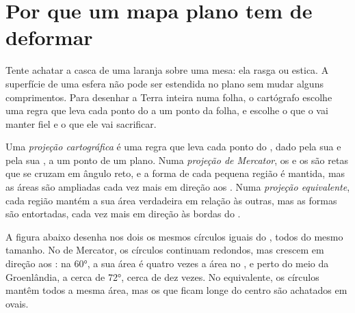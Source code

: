 \section{Por que um mapa plano tem de deformar}

Tente achatar a casca de uma laranja sobre uma mesa: ela rasga ou estica.
A superfície de uma esfera não pode ser estendida no plano sem mudar
alguns comprimentos. Para desenhar a Terra inteira numa folha, o
cartógrafo escolhe uma regra que leva cada ponto do  a um ponto da
folha, e escolhe o que o  vai manter fiel e o que ele vai sacrificar.

\begin{definition}\label{def:g9:maps-of-the-earth:projection}
Uma \emph{projeção cartográfica}
é uma regra que leva cada ponto do , dado pela sua  e pela
sua , a um ponto de um  plano. Numa \emph{projeção de
Mercator}, os  e
os  são retas que se cruzam em ângulo reto, e a forma de cada
pequena região é mantida, mas as áreas são ampliadas cada vez mais em
direção aos . Numa \emph{projeção
equivalente}, cada
região mantém a sua área verdadeira em relação às outras, mas as formas
são entortadas, cada vez mais em direção às bordas do .
\end{definition}

A figura abaixo desenha nos dois  os mesmos círculos iguais do ,
todos do mesmo tamanho. No  de Mercator, os círculos continuam
redondos, mas crescem em direção aos : na  \ang{60}, a sua
área é quatro vezes a área no , e perto do meio da Groenlândia, a
cerca de \ang{72}, cerca de dez vezes. No  equivalente, os círculos
mantêm todos a mesma área, mas os que ficam longe do centro são achatados
em ovais.

